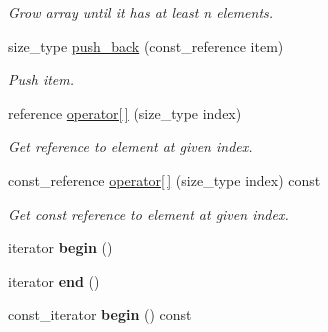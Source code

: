 \begin{DoxyCompactItemize}
\begin{DoxyCompactList}\small\item\em Grow array until it has at least n elements. \end{DoxyCompactList}\item 
\hypertarget{classtbb_1_1concurrent__vector_a9bd8ef8940a16f9f0a4a8582e9ac5ca4}{}size\+\_\+type \hyperlink{classtbb_1_1concurrent__vector_a9bd8ef8940a16f9f0a4a8582e9ac5ca4}{push\+\_\+back} (const\+\_\+reference item)\label{classtbb_1_1concurrent__vector_a9bd8ef8940a16f9f0a4a8582e9ac5ca4}

\begin{DoxyCompactList}\small\item\em Push item. \end{DoxyCompactList}\item 
reference \hyperlink{classtbb_1_1concurrent__vector_ac70975c8f71b9f8acbda50188c5b4f5d}{operator\mbox{[}$\,$\mbox{]}} (size\+\_\+type index)
\begin{DoxyCompactList}\small\item\em Get reference to element at given index. \end{DoxyCompactList}\item 
\hypertarget{classtbb_1_1concurrent__vector_ab233686fd3c55cdca599dbb35171fabe}{}const\+\_\+reference \hyperlink{classtbb_1_1concurrent__vector_ab233686fd3c55cdca599dbb35171fabe}{operator\mbox{[}$\,$\mbox{]}} (size\+\_\+type index) const \label{classtbb_1_1concurrent__vector_ab233686fd3c55cdca599dbb35171fabe}

\begin{DoxyCompactList}\small\item\em Get const reference to element at given index. \end{DoxyCompactList}\item 
\hypertarget{classtbb_1_1concurrent__vector_a2914571ae4553453e3046132bd1dc4ec}{}iterator {\bfseries begin} ()\label{classtbb_1_1concurrent__vector_a2914571ae4553453e3046132bd1dc4ec}

\item 
\hypertarget{classtbb_1_1concurrent__vector_a2103c324fe1195d57778df2b4df2a427}{}iterator {\bfseries end} ()\label{classtbb_1_1concurrent__vector_a2103c324fe1195d57778df2b4df2a427}

\item 
\hypertarget{classtbb_1_1concurrent__vector_aa4339915512950e809abdc71164570f9}{}const\+\_\+iterator {\bfseries begin} () const \label{classtbb_1_1concurrent__vector_aa4339915512950e809abdc71164570f9}


\end{DoxyCompactItemize}
